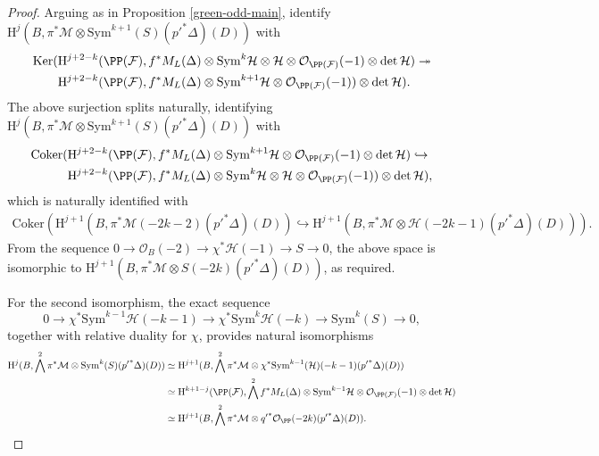 \begin{proof}
Arguing as in Proposition \ref{green-odd-main}, identify $\mathrm{H}^j(B, \pi^* \mathcal{M} \otimes \mathrm{Sym}^{k+1}(S)({p'}^*\Delta)(D))$ with
{\small{\begin{align*}
\mathrm{Ker}(&\mathrm{H}^{j+2-k}(\PP(\mathcal{F}),f^*M_L(\Delta) \otimes \mathrm{Sym}^k\mathcal{H} \otimes \mathcal{H} \otimes \mathcal{O}_{\PP(\mathcal{F})}(-1) \otimes \det\mathcal{H}) \twoheadrightarrow  \\
&\mathrm{H}^{j+2-k}(\PP(\mathcal{F}),f^*M_L(\Delta) \otimes \mathrm{Sym}^{k+1}\mathcal{H} \otimes \mathcal{O}_{\PP(\mathcal{F})}(-1)) \otimes \det \mathcal{H}) .
\end{align*}}}
The above surjection splits naturally, identifying $\mathrm{H}^j(B, \pi^* \mathcal{M} \otimes \mathrm{Sym}^{k+1}(S)({p'}^*\Delta)(D))$ with
{\small{\begin{align*}
\mathrm{Coker}(&\mathrm{H}^{j+2-k}(\PP(\mathcal{F}),f^*M_L(\Delta) \otimes \mathrm{Sym}^{k+1}\mathcal{H} \otimes \mathcal{O}_{\PP(\mathcal{F})}(-1) \otimes \det \mathcal{H}) \hookrightarrow \\
&\mathrm{H}^{j+2-k}(\PP(\mathcal{F}),f^*M_L(\Delta) \otimes \mathrm{Sym}^k\mathcal{H} \otimes \mathcal{H} \otimes \mathcal{O}_{\PP(\mathcal{F})}(-1)) \otimes \det \mathcal{H}),
\end{align*}}}
which is naturally identified with
\begin{align*}
\mathrm{Coker}\left( \mathrm{H}^{j+1}(B, \pi^* \mathcal{M}(-2k-2)({p'}^*\Delta)(D)) \hookrightarrow
 \mathrm{H}^{j+1}(B, \pi^* \mathcal{M} \otimes \mathcal{H}(-2k-1)({p'}^*\Delta)(D))\right).
\end{align*}
From the sequence $0 \to \mathcal{O}_B(-2) \to \chi^* \mathcal{H} (-1)  \to S \to 0$, the above space is isomorphic to $\mathrm{H}^{j+1}(B, \pi^* \mathcal{M} \otimes S(-2k)({p'}^*\Delta)(D))$, as required.

For the second isomorphism, the exact sequence
$$0 \to \chi^* \mathrm{Sym}^{k-1} \mathcal{H} (-k-1) \to \chi^*\mathrm{Sym}^{k} \mathcal{H} (-k) \to \mathrm{Sym}^k(S) \to 0,$$
together with relative duality for $\chi$, provides natural isomorphisms
{\small{\begin{align*}
\mathrm{H}^{j}(B, \bigwedge^{2}\pi^*\mathcal{M}  \otimes \mathrm{Sym}^k(S)({p'}^*\Delta)(D))& \simeq \mathrm{H}^{j+1}(B,\bigwedge^{2}\pi^*\mathcal{M}  \otimes \chi^*\mathrm{Sym}^{k-1}(\mathcal{H})(-k-1)({p'}^*\Delta)(D)) \\
&\simeq \mathrm{H}^{k+1-j}(\PP(\mathcal{F}), \bigwedge^{2}f^*M_L(\Delta) \otimes \mathrm{Sym}^{k-1}\mathcal{H} \otimes \mathcal{O}_{\PP(\mathcal{F})}(-1)\otimes \det \mathcal{H})\\
& \simeq \mathrm{H}^{j+1}(B,\bigwedge^{2}\pi^*\mathcal{M}  \otimes {q'}^*\mathcal{O}_{\PP}(-2k)({p'}^*\Delta)(D)).
\end{align*}}}
\end{proof}
